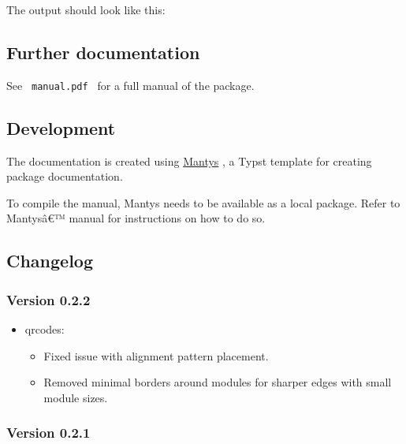The output should look like this:

\subsection{Further documentation}\label{further-documentation}

See \texttt{\ manual.pdf\ } for a full manual of the package.

\subsection{Development}\label{development}

The documentation is created using
\href{https://github.com/jneug/typst-mantys}{Mantys} , a Typst template
for creating package documentation.

To compile the manual, Mantys needs to be available as a local package.
Refer to Mantysâ€™ manual for instructions on how to do so.

\subsection{Changelog}\label{changelog}

\subsubsection{Version 0.2.2}\label{version-0.2.2}

\begin{itemize}
\tightlist
\item
  qrcodes:

  \begin{itemize}
  \tightlist
  \item
    Fixed issue with alignment pattern placement.
  \item
    Removed minimal borders around modules for sharper edges with small
    module sizes.
  \end{itemize}
\end{itemize}

\subsubsection{Version 0.2.1}\label{version-0.2.1}

